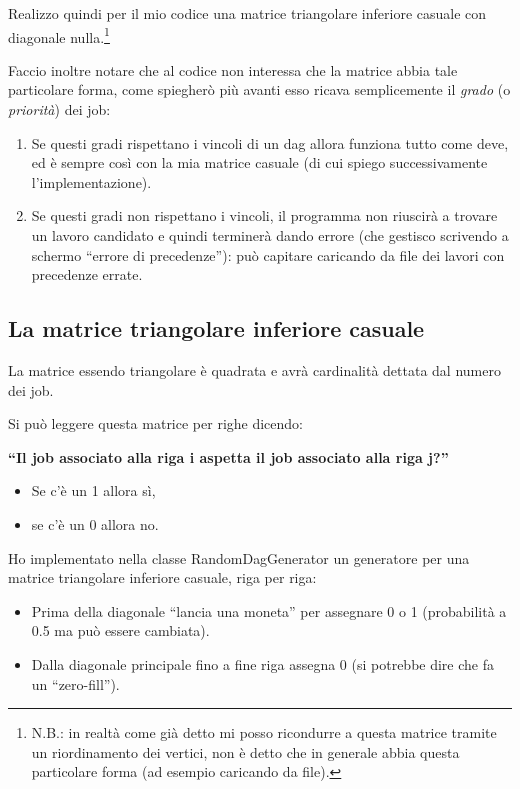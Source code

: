\documentclass[12pt, letterpaper]{article}
\begin{document}
Realizzo quindi per il mio codice una matrice triangolare inferiore casuale con diagonale nulla.\footnote{N.B.: in realtà come già detto mi posso ricondurre a questa matrice tramite un riordinamento dei vertici, non è detto che in generale abbia questa particolare forma (ad esempio caricando da file).}

Faccio inoltre notare che al codice non interessa che la matrice abbia tale particolare forma, come spiegherò più avanti esso ricava semplicemente il \textit{grado} (o \textit{priorità}) dei job:
\begin{enumerate}
\item{Se questi gradi rispettano i vincoli di un dag allora funziona tutto come deve, ed è sempre così con la mia matrice casuale (di cui spiego successivamente l'implementazione).}
\item{Se questi gradi non rispettano i vincoli, il programma non riuscirà a trovare un lavoro candidato e quindi terminerà dando errore (che gestisco scrivendo a schermo ``errore di precedenze''): può capitare caricando da file dei lavori con precedenze errate.}
\end{enumerate}

\subsection{La matrice triangolare inferiore casuale}

La matrice essendo triangolare è quadrata e avrà cardinalità dettata dal numero dei job.

Si può leggere questa matrice per righe dicendo:
\medskip

\textbf{``Il job associato alla riga i aspetta il job associato alla riga j?''}
\begin{itemize}
\item{Se c'è un 1 allora sì,}
\item{se c'è un 0 allora no.}
\end{itemize}

Ho implementato nella classe RandomDagGenerator un generatore per una matrice triangolare inferiore casuale, riga per riga:
\begin{itemize}
\item{Prima della diagonale ``lancia una moneta'' per assegnare 0 o 1 (probabilità a 0.5 ma può essere cambiata).}
\item{Dalla diagonale principale fino a fine riga assegna 0 (si potrebbe dire che fa un ``zero-fill'').}
\end{itemize}
\end{document}
